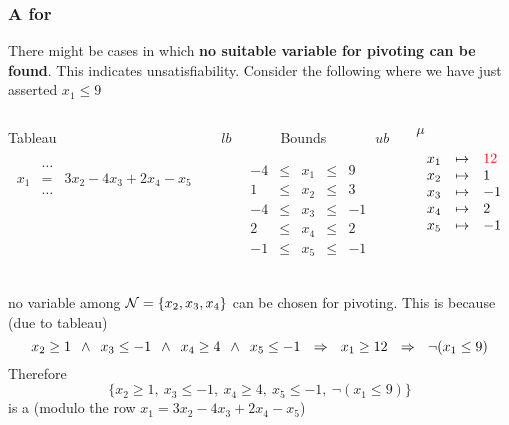 \begin{frame}
  \frametitle{A \tsolver for \Lra}

  \scriptsize

  There might be cases in which {\bf no suitable variable for pivoting can be found}.
  This indicates unsatisfiability. Consider the following where we have just asserted $x_1 \leq 9$
  \vfill
  \begin{columns}

  \begin{column}{.4\textwidth}
  \begin{center}
  Tableau
  \end{center}
  $$
  \begin{array}{rcl}
    & \ldots \\                             
    x_1 & = & 3 x_2 - 4 x_3 + 2 x_4 - x_5 \\ 
    & \ldots \\                             
    \\
    \\
  \end{array}
  $$
  \end{column}

  \begin{column}{.3\textwidth}
  \begin{center}
  $lb$~~~~~~~Bounds~~~~~~~$ub$
  \end{center}
  $$
  \begin{array}{rcccl}
     -4 & \leq & x_1 & \leq & 9 \\
      1 & \leq & x_2 & \leq & 3 \\
     -4 & \leq & x_3 & \leq & -1 \\
      2 & \leq & x_4 & \leq & 2 \\
     -1 & \leq & x_5 & \leq & -1 \\
  \end{array}
  $$
  \end{column}

  \begin{column}{.3\textwidth}
  \begin{center}
  $\mu$
  \end{center}
  $$
  \begin{array}{rcl}
  x_1 & \mapsto & \textcolor{red}{12} \\
  x_2 & \mapsto & 1 \\
  x_3 & \mapsto & -1 \\
  x_4 & \mapsto & 2 \\
  x_5 & \mapsto & -1 
  \end{array}
  $$
  \end{column}

  \end{columns}
  \vfill
  no variable among $\mathcal{N} = \{ x_2, x_3, x_4 \}$ can be chosen for pivoting. This is because (due to tableau)
  $$x_2 \geq 1\ \swedge\ x_3 \leq -1\ \swedge\ x_4 \geq 4\ \swedge\ x_5 \leq -1\ \ \Rightarrow\ \ x_1 \geq 12\ \ \Rightarrow\ \ \neg (x_1 \leq 9)$$
  \vfill
  Therefore
  $$\{ x_2 \geq 1,\ x_3 \leq -1,\ x_4 \geq 4,\ x_5 \leq -1,\ \neg( x_1 \leq 9 ) \}$$
  is a \tconflict (modulo the row $x_1 = 3 x_2 - 4 x_3 + 2 x_4 - x_5$)

\end{frame}

